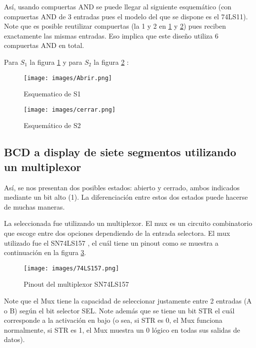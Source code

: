 \documentclass[12pt,a4paper]{article}
\begin{document}
Así, usando compuertas AND se puede llegar al siguiente esquemático (con compuertas AND de 3 entradas pues el modelo del que se dispone es el 74LS11). Note que es posible reutilizar compuertas (la 1 y 2 en \ref{fig:S1} y \ref{fig:S2}) pues reciben exactamente las mismas entradas. Eso implica que este diseño utiliza 6 compuertas AND en total. 

Para $S_1$ la figura \ref{fig:S1} y para $S_2$ la figura \ref{fig:S2} :

\begin{figure}[h!] %
    \centering    
    \texttt{[image: images/Abrir.png]} %
    \caption{Esquematico de S1}
    \label{fig:S1}
\end{figure}

\begin{figure}[h!] %
    \centering    
    \texttt{[image: images/cerrar.png]} %
    \caption{Esquemático de S2}
    \label{fig:S2}
\end{figure}

\subsection{BCD a display de siete segmentos utilizando un multiplexor}

Así, se nos presentan dos posibles estados: abierto y cerrado, ambos indicados mediante un bit alto (1). La diferenciación entre estos dos estados puede hacerse de muchas maneras.

La seleccionada fue utilizando un multiplexor. El mux es un circuito combinatorio que escoge entre dos opciones dependiendo de la entrada selectora. El mux utilizado fue el SN74LS157 \cite{Sandorobotics_74LS157} , el cuál tiene un pinout como se muestra a continuación en la figura \ref{fig:74LS157}.

\begin{figure}[h!] %
    \centering    
    \texttt{[image: images/74LS157.png]} %
    \caption{Pinout del multiplexor SN74LS157 \cite{Sandorobotics_74LS157}}
    \label{fig:74LS157}
\end{figure}


Note que el Mux tiene la capacidad de seleccionar justamente entre 2 entradas (A o B) según el bit selector SEL. Note además que se tiene un bit STR el cuál corresponde a la activación en bajo (o sea, si STR es 0, el Mux funciona normalmente, si STR es 1, el Mux muestra un 0 lógico en todas sus salidas de datos).
\end{document}
